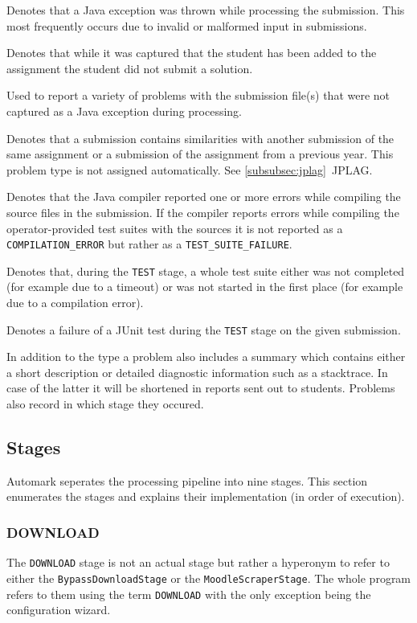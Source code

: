 \documentclass[12pt,a4paper,oneside]{report}
\begin{document}
	\begin{description}[align=left]
		\item[EXCEPTION] Denotes that a Java exception was thrown while processing the submission. This most frequently occurs due to invalid or malformed input in submissions.
		\item[NOT\_SUBMITTED] Denotes that while it was captured that the student has been added to the assignment the student did not submit a solution.
		\item[INVALID\_SUBMISSION\_FILE] Used to report a variety of problems with the submission file(s) that were not captured as a Java exception during processing.
		\item[PLAGIARIZED] Denotes that a submission contains similarities with another submission of the same assignment or a submission of the assignment from a previous year. This problem type is not assigned automatically. See \ref{subsubsec:jplag}~JPLAG.
		\item[COMPILATION\_ERROR] Denotes that the Java compiler reported one or more errors while compiling the source files in the submission. If the compiler reports errors while compiling the operator-provided test suites with the sources it is not reported as a \lstinline|COMPILATION_ERROR| but rather as a \lstinline|TEST_SUITE_FAILURE|.
		\item[TEST\_SUITE\_FAILURE] Denotes that, during the \lstinline|TEST| stage, a whole test suite either was not completed (for example due to a timeout) or was not started in the first place (for example due to a compilation error).
		\item[TEST\_FAILURE] Denotes a failure of a JUnit test during the \lstinline|TEST| stage on the given submission.
	\end{description}

	In addition to the type a problem also includes a summary which contains either a short description or detailed diagnostic information such as a stacktrace. In case of the latter it will be shortened in reports sent out to students. Problems also record in which stage they occured.

	\subsection{Stages}
	Automark seperates the processing pipeline into nine stages. This section enumerates the stages and explains their implementation (in order of execution).

	\subsubsection{DOWNLOAD}
	The \lstinline|DOWNLOAD| stage is not an actual stage but rather a hyperonym to refer to either the \lstinline|BypassDownloadStage| or the \lstinline|MoodleScraperStage|. The whole program refers to them using the term \lstinline|DOWNLOAD| with the only exception being the configuration wizard.
\end{document}
